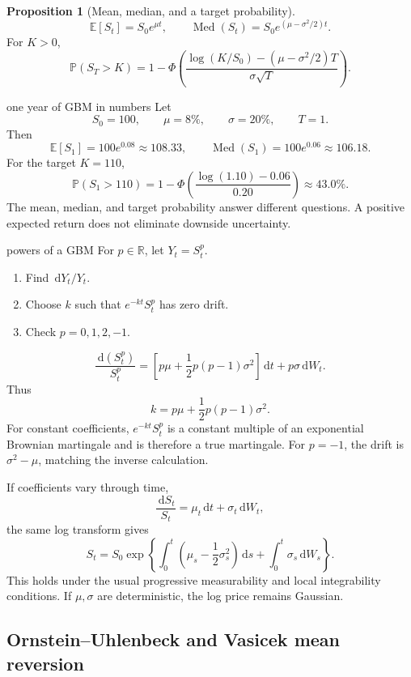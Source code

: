 \documentclass[10pt]{article}
\newcommand{\E}{\mathbb E}
\newcommand{\Pp}{\mathbb P}
\newcommand{\R}{\mathbb R}
\newcommand{\1}{\mathbf 1}
\newcommand{\dd}{\,\mathrm d}
\DeclareMathOperator{\Med}{Med}
\theoremstyle{definition}
\newtheorem{proposition}[definition]{Proposition}
\begin{document}
\begin{proposition}[Mean, median, and a target probability]
\[
\E[S_t]=S_0e^{\mu t},
\qquad
\Med(S_t)=S_0e^{(\mu-\sigma^2/2)t}.
\]
For \(K>0\),
\[
\Pp(S_T>K)
=1-\Phi\left(
\frac{\log(K/S_0)-(\mu-\sigma^2/2)T}
{\sigma\sqrt T}
\right).
\]
\end{proposition}

\begin{boardexample}{one year of GBM in numbers}
Let
\[
S_0=100,\qquad \mu=8\%,\qquad \sigma=20\%,\qquad T=1.
\]
Then
\[
\E[S_1]=100e^{0.08}\approx108.33,
\qquad
\Med(S_1)=100e^{0.06}\approx106.18.
\]
For the target \(K=110\),
\[
\Pp(S_1>110)
=1-\Phi\left(\frac{\log(1.10)-0.06}{0.20}\right)
\approx43.0\%.
\]
The mean, median, and target probability answer different questions. A
positive expected return does not eliminate downside uncertainty.
\end{boardexample}

\begin{studentexercise}{powers of a GBM}
For \(p\in\R\), let \(Y_t=S_t^p\).
\begin{enumerate}
  \item Find \(\dd Y_t/Y_t\).
  \item Choose \(k\) such that \(e^{-kt}S_t^p\) has zero drift.
  \item Check \(p=0,1,2,-1\).
\end{enumerate}
\end{studentexercise}
\begin{shortsolution}
\[
\boxed{
\frac{\dd(S_t^p)}{S_t^p}
=\left[p\mu+\frac12p(p-1)\sigma^2\right]\dd t
+p\sigma\dd W_t.}
\]
Thus
\[
k=p\mu+\frac12p(p-1)\sigma^2.
\]
For constant coefficients, \(e^{-kt}S_t^p\) is a constant multiple of an
exponential Brownian martingale and is therefore a true martingale. For
\(p=-1\), the drift is \(\sigma^2-\mu\), matching the inverse calculation.
\end{shortsolution}

If coefficients vary through time,
\[
\frac{\dd S_t}{S_t}
=\mu_t\dd t+\sigma_t\dd W_t,
\]
the same log transform gives
\[
\boxed{
S_t=S_0\exp\left\{
\int_0^t\left(\mu_s-\frac12\sigma_s^2\right)\dd s
+\int_0^t\sigma_s\dd W_s
\right\}.}
\]
This holds under the usual progressive measurability and local integrability
conditions. If \(\mu,\sigma\) are deterministic, the log price remains
Gaussian.

\subsection{Ornstein--Uhlenbeck and Vasicek mean reversion}
\end{document}
